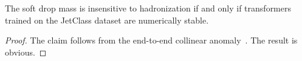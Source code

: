 \begin{corollary}[Uniqueness]\label{thm:3}
The soft drop mass is insensitive to hadronization if and only if
transformers trained on the JetClass dataset are numerically stable.
\end{corollary}

\begin{proof}
The claim follows from the end-to-end collinear
anomaly~\cite{TPC:1420-STRANGE-Self-Supervised-Two-Loop-Real-Virtual-Asymptotic-Neural-Gluon-Initiated-Embeddings-September-24-2026}.
The result is obvious.
\end{proof}

